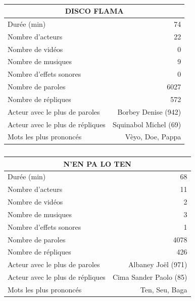     \begin{table}[]
    \centering
    \caption{}
    \begin{tabular}{lr}\toprule\multicolumn{2}{c}{DISCO FLAMA} \\\midrule
\multicolumn{1}{l}{Durée (min)}&74\\
\multicolumn{1}{l}{Nombre d'acteurs}&22\\
\multicolumn{1}{l}{Nombre de vidéos}&0\\
\multicolumn{1}{l}{Nombre de musiques}&9\\
\multicolumn{1}{l}{Nombre d'effets sonores}&0\\
\multicolumn{1}{l}{Nombre de paroles}&6027\\
\multicolumn{1}{l}{Nombre de répliques}&572\\
\multicolumn{1}{l}{Acteur avec le plus de paroles}&Borbey Denise (942)\\
\multicolumn{1}{l}{Acteur avec le plus de répliques}&Squinabol Michel (69)\\
\multicolumn{1}{l}{Mots les plus prononcés}&Vèyo, Doe, Pappa\\
    \bottomrule
    \end{tabular}%
    \end{table}
    \begin{table}[]
    \centering
    \caption{}
    \begin{tabular}{lr}\toprule\multicolumn{2}{c}{N'EN PA LO TEN} \\\midrule
\multicolumn{1}{l}{Durée (min)}&68\\
\multicolumn{1}{l}{Nombre d'acteurs}&11\\
\multicolumn{1}{l}{Nombre de vidéos}&2\\
\multicolumn{1}{l}{Nombre de musiques}&3\\
\multicolumn{1}{l}{Nombre d'effets sonores}&1\\
\multicolumn{1}{l}{Nombre de paroles}&4078\\
\multicolumn{1}{l}{Nombre de répliques}&426\\
\multicolumn{1}{l}{Acteur avec le plus de paroles}&Albaney Joël (971)\\
\multicolumn{1}{l}{Acteur avec le plus de répliques}&Cima Sander Paolo (85)\\
\multicolumn{1}{l}{Mots les plus prononcés}&Ten, Seu, Baga\\
    \bottomrule
    \end{tabular}%
    \end{table}
